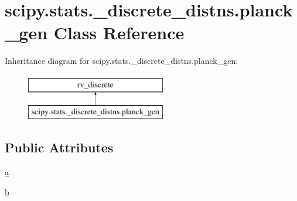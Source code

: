 \hypertarget{classscipy_1_1stats_1_1__discrete__distns_1_1planck__gen}{}\section{scipy.\+stats.\+\_\+discrete\+\_\+distns.\+planck\+\_\+gen Class Reference}
\label{classscipy_1_1stats_1_1__discrete__distns_1_1planck__gen}
Inheritance diagram for scipy.\+stats.\+\_\+discrete\+\_\+distns.\+planck\+\_\+gen\+:\begin{figure}[H]
\begin{center}
\leavevmode
\includegraphics[height=2.000000cm]{classscipy_1_1stats_1_1__discrete__distns_1_1planck__gen}
\end{center}
\end{figure}
\subsection*{Public Attributes}
\begin{DoxyCompactItemize}
\item 
\hyperlink{classscipy_1_1stats_1_1__discrete__distns_1_1planck__gen_ac914847178afade894f8c731f960c036}{a}
\item 
\hyperlink{classscipy_1_1stats_1_1__discrete__distns_1_1planck__gen_a08b26301304204dc202fd4e8f607891d}{b}
\end{DoxyCompactItemize}


